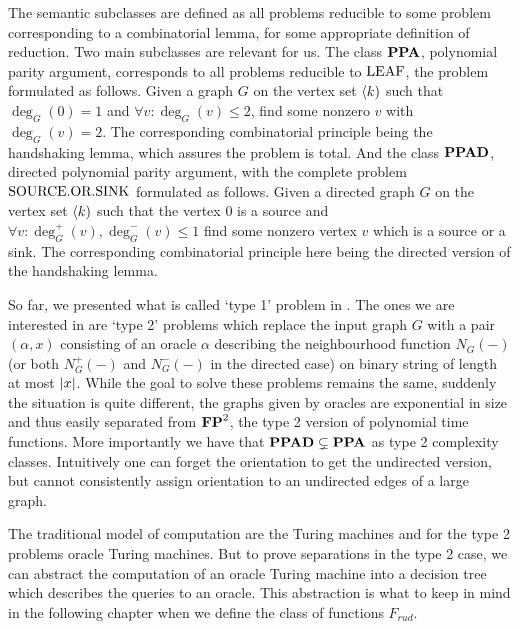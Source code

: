 The semantic subclasses are defined as all problems reducible to some problem corresponding to a combinatorial lemma, for some appropriate definition of reduction. Two main subclasses are relevant for us. The class $\textbf{PPA}$, polynomial parity argument, corresponds to all problems reducible to $\text{LEAF}$, the problem formulated as follows. Given a graph $G$ on the vertex set $\langle k)$ such that $\deg_G(0)=1$ and $\forall v: \deg_G(v)\leq 2$, find some nonzero $v$ with $\deg_G(v)=2$. The corresponding combinatorial principle being the handshaking lemma, which assures the problem is total. And the class $\textbf{PPAD}$, directed polynomial parity argument, with the complete problem $\text{SOURCE.OR.SINK}$ formulated as follows. Given a directed graph $G$ on the vertex set $\langle k)$ such that the vertex $0$ is a source and $\forall v: \deg_G^+(v),\deg_G^-(v)\leq 1$ find some nonzero vertex $v$ which is a source or a sink. The corresponding combinatorial principle here being the directed version of the handshaking lemma.

So far, we presented what is called `type 1' problem in \cite{beame1995rel}. The ones we are interested in are `type 2' problems which replace the input graph $G$ with a pair $(\alpha,x)$ consisting of an oracle $\alpha$ describing the neighbourhood function $N_G(-)$ (or both $N_G^+(-)$ and $N_G^-(-)$ in the directed case) on binary string of length at most $\left|{x}\right|$. While the goal to solve these problems remains the same, suddenly the situation is quite different, the graphs given by oracles are exponential in size and thus easily separated from $\textbf{FP}^2$, the type 2 version of polynomial time functions. More importantly we have that $\textbf{PPAD}\subsetneq \textbf{PPA}$ as type 2 complexity classes. Intuitively one can forget the orientation to get the undirected version, but cannot consistently assign orientation to an undirected edges of a large graph.

The traditional model of computation are the Turing machines and for the type 2 problems oracle Turing machines. But to prove separations in the type 2 case, we can abstract the computation of an oracle Turing machine into a decision tree which describes the queries to an oracle. This abstraction is what to keep in mind in the following chapter when we define the class of functions $F_{rud}$.
